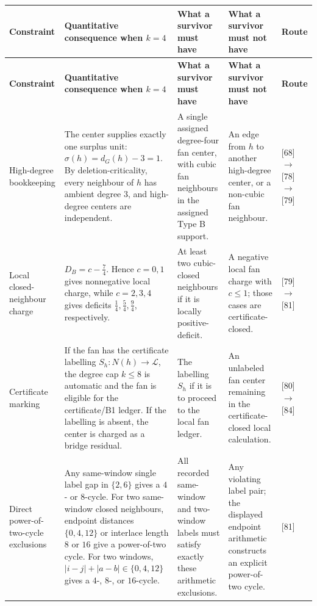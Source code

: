 \documentclass[11pt]{article}
\newcommand{\labels}{\mathcal L}
\begin{document}
{\scriptsize\setlength{\tabcolsep}{2.5pt}
\begin{longtable}{L{0.16\textwidth} L{0.19\textwidth} L{0.23\textwidth} L{0.23\textwidth} L{0.10\textwidth}}
\toprule
\textbf{Constraint} & \textbf{Quantitative consequence when \(k=4\)} &
\textbf{What a survivor must have} &
\textbf{What a survivor must not have} &
\textbf{Route}\\
\midrule
\endfirsthead
\toprule
\textbf{Constraint} & \textbf{Quantitative consequence when \(k=4\)} &
\textbf{What a survivor must have} &
\textbf{What a survivor must not have} &
\textbf{Route}\\
\midrule
\endhead
High-degree bookkeeping
&
The center supplies exactly one surplus unit:
\(\sigma(h)=d_G(h)-3=1\).  By deletion-criticality, every neighbour of \(h\)
has ambient degree \(3\), and high-degree centers are independent.
&
A single assigned degree-four fan center, with cubic fan neighbours in the
assigned Type B support.
&
An edge from \(h\) to another high-degree center, or a non-cubic fan neighbour.
&
[68]\(\to\)[78]\(\to\)[79]\\
\addlinespace
Local closed-neighbour charge
&
\(D_B=c-\frac74\).  Hence \(c=0,1\) gives nonnegative local charge, while
\(c=2,3,4\) gives deficits \(\frac14,\frac54,\frac94\), respectively.
&
At least two cubic-closed neighbours if it is locally positive-deficit.
&
A negative local fan charge with \(c\le1\); those cases are
certificate-closed.
&
[79]\(\to\)[81]\\
\addlinespace
Certificate marking
&
If the fan has the certificate labelling \(S_h:N(h)\to\labels\), the degree cap
\(k\le8\) is automatic and the fan is eligible for the certificate/B1 ledger.
If the labelling is absent, the center is charged as a bridge residual.
&
The labelling \(S_h\) if it is to proceed to the local fan ledger.
&
An unlabeled fan center remaining in the certificate-closed local calculation.
&
[80]\(\to\)[84]\\
\addlinespace
Direct power-of-two-cycle exclusions
&
Any same-window single label gap in \(\{2,6\}\) gives a \(4\)- or \(8\)-cycle.
For two same-window closed neighbours, endpoint distances
\(\{0,4,12\}\) or interlace length \(8\) or \(16\) give a power-of-two cycle.  For
two windows, \(|i-j|+|a-b|\in\{0,4,12\}\) gives a \(4\)-, \(8\)-, or
\(16\)-cycle.
&
All recorded same-window and two-window labels must satisfy exactly these
arithmetic exclusions.
&
Any violating label pair; the displayed endpoint arithmetic constructs an
explicit power-of-two cycle.
&
[81]\\

\end{longtable}}
\end{document}

